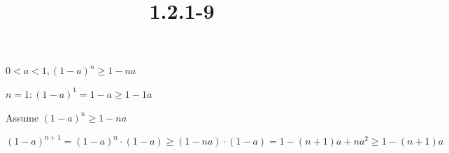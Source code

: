 \documentclass{article}
\title{1.2.1-9}
\begin{document}
\maketitle

$0 < a < 1, (1-a)^n\geq 1-na$

$n = 1: (1-a)^1=1-a\geq 1 - 1a$

Assume $(1-a)^n \geq 1 - na$

$(1-a)^{n+1}=(1-a)^n\cdot(1-a)\geq(1-na)\cdot(1-a)=1-(n+1)a+na^2\geq1-(n+1)a$
\end{document}
